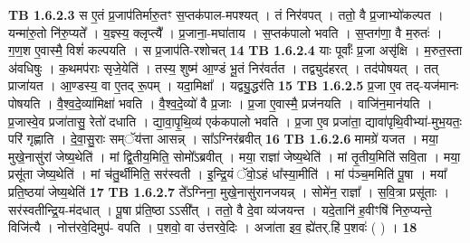\documentclass[17pt]{extarticle}
\begin{document}
                  \newline
                                \textbf{ TB 1.6.2.3} \newline
                  स ए॒तं प्र॒जाप॑तिर्मारु॒तꣳ स॒प्तक॑पाल-मपश्यत् । तं निर॑वपत् । ततो॒ वै प्र॒जाभ्यो॑कल्पत । यन्मा॑रु॒तो नि॑रु॒प्यते᳚ । य॒ज्ञ्स्य॒ क्लृप्त्यै᳚ । प्र॒जाना॒-मघा॑ताय । स॒प्तक॑पालो भवति । स॒प्तग॑णा॒ वै म॒रुतः॑ । ग॒ण॒श ए॒वास्मै॒ विशं॑ कल्पयति । स प्र॒जाप॑ति-रशोचत् \textbf{ 14} \newline
                  \newline
                                \textbf{ TB 1.6.2.4} \newline
                  याः पूर्वाः᳚ प्र॒जा असृ॑क्षि । म॒रुत॒स्ता अ॑वधिषुः । क॒थमप॑राः सृजे॒येति॑ । तस्य॒ शुष्म॑ आ॒ण्डं भू॒तं निर॑वर्तत । तद्व्युद॑हरत् । तद॑पोषयत् । तत् प्राजा॑यत । आ॒ण्डस्य॒ वा ए॒तद् रू॒पम् । यदा॒मिक्षा᳚ । यद्व्यु॒द्धर॑ति \textbf{ 15} \newline
                  \newline
                                \textbf{ TB 1.6.2.5} \newline
                  प्र॒जा ए॒व तद्-यज॑मानः पोषयति । वै॒श्व॒दे॒व्या॑मिक्षा॑ भवति । वै॒श्व॒दे॒व्यो॑ वै प्र॒जाः । प्र॒जा ए॒वास्मै॒ प्रज॑नयति । वाजि॑न॒मान॑यति । प्र॒जास्वे॒व प्रजा॑तासु॒ रेतो॑ दधाति । द्या॒वा॒पृ॒थि॒व्य॑ एक॑कपालो भवति । प्र॒जा ए॒व प्रजा॑ता॒ द्यावा॑पृथि॒वीभ्या॑-मुभ॒यतः॒ परि॑ गृह्णाति । दे॒वा॒सु॒राः सम्ॅय॑त्ता आसन्न् । सा᳚ऽग्निर॑ब्रवीत् \textbf{ 16} \newline
                  \newline
                                \textbf{ TB 1.6.2.6} \newline
                  मामग्रे॑ यजत । मया॒ मुखे॒नासु॑रां जेष्य॒थेति॑ । मां द्वि॒तीय॒मिति॒ सोमो᳚ऽब्रवीत् । मया॒ राज्ञा॑ जेष्य॒थेति॑ । मां तृ॒तीय॒मिति॑ सवि॒ता । मया॒ प्रसू॑ता जेष्य॒थेति॑ । मां च॑तु॒र्थीमिति॒ सर॑स्वती । इ॒न्द्रि॒यं ॅवो॒ऽहं धा᳚स्या॒मीति॑ । मां प॑ञ्च॒ममिति॑ पू॒षा । मया᳚ प्रति॒ष्ठया॑ जेष्य॒थेति॑ \textbf{ 17} \newline
                  \newline
                                \textbf{ TB 1.6.2.7} \newline
                  ते᳚ऽग्निना॒ मुखे॒नासु॑रानजयन्न् । सोमे॑न॒ राज्ञा᳚ । स॒वि॒त्रा प्रसू॑ताः । सर॑स्वतीन्द्रि॒य-म॑दधात् । पू॒षा प्र॑ति॒ष्ठा ऽऽसी᳚त् । ततो॒ वै दे॒वा व्य॑जयन्त । यदे॒तानि॑ ह॒वीꣳषि॑ निरु॒प्यन्ते॒ विजि॑त्यै । नोत्त॑रवे॒दिमुप॑- वपति । प॒शवो॒ वा उ॑त्तरवे॒दिः । अजा॑ता इव॒ ह्ये॑तर्.हि॑ प॒शवः॑ ( ) । \textbf{ 18} \newline
\end{document}

